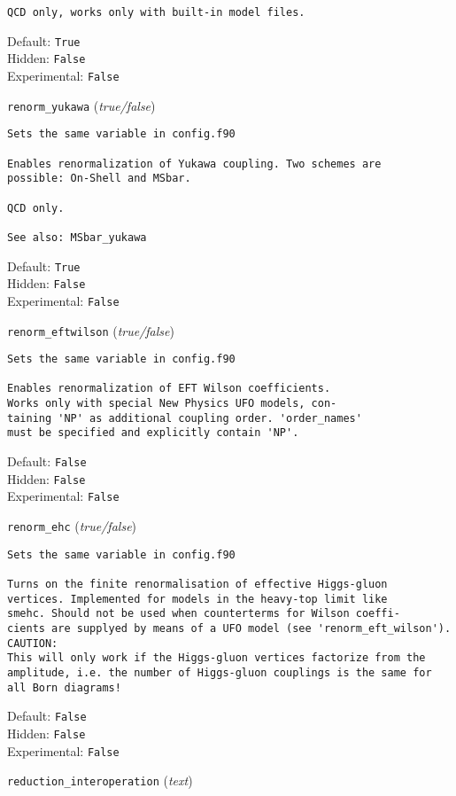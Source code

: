 \begin{basedescript}{\desclabelstyle{\pushlabel}}
\begin{verbatim}
QCD only, works only with built-in model files.
\end{verbatim}
Default: \verb|True|
\\Hidden: \verb|False|
\\Experimental: \verb|False|
\\\item[\colorbox{gray!30}{\texttt{renorm\_yukawa}}] (\textit{true/false})
\begin{verbatim}
Sets the same variable in config.f90

Enables renormalization of Yukawa coupling. Two schemes are
possible: On-Shell and MSbar.

QCD only.

See also: MSbar_yukawa
\end{verbatim}
Default: \verb|True|
\\Hidden: \verb|False|
\\Experimental: \verb|False|
\\\item[\colorbox{gray!30}{\texttt{renorm\_eftwilson}}] (\textit{true/false})
\begin{verbatim}
Sets the same variable in config.f90

Enables renormalization of EFT Wilson coefficients.
Works only with special New Physics UFO models, con-
taining 'NP' as additional coupling order. 'order_names'
must be specified and explicitly contain 'NP'.
\end{verbatim}
Default: \verb|False|
\\Hidden: \verb|False|
\\Experimental: \verb|False|
\\\item[\colorbox{gray!30}{\texttt{renorm\_ehc}}] (\textit{true/false})
\begin{verbatim}
Sets the same variable in config.f90

Turns on the finite renormalisation of effective Higgs-gluon
vertices. Implemented for models in the heavy-top limit like
smehc. Should not be used when counterterms for Wilson coeffi-
cients are supplyed by means of a UFO model (see 'renorm_eft_wilson').
CAUTION:
This will only work if the Higgs-gluon vertices factorize from the
amplitude, i.e. the number of Higgs-gluon couplings is the same for
all Born diagrams!
\end{verbatim}
Default: \verb|False|
\\Hidden: \verb|False|
\\Experimental: \verb|False|
\\\item[\colorbox{gray!30}{\texttt{reduction\_interoperation}}] (\textit{text})
\begin{verbatim}


\end{verbatim}
\end{basedescript}

